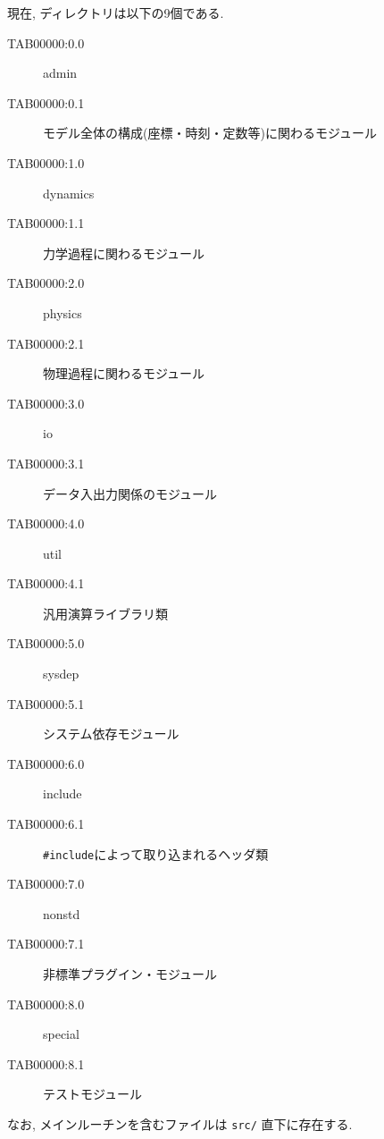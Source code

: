 現在, ディレクトリは以下の9個である. 
\begin{center}
\begin{description}
\item[TAB00000:0.0] admin
\item[TAB00000:0.1] モデル全体の構成(座標・時刻・定数等)に関わるモジュール
\item[TAB00000:1.0] dynamics
\item[TAB00000:1.1] 力学過程に関わるモジュール
\item[TAB00000:2.0] physics
\item[TAB00000:2.1] 物理過程に関わるモジュール
\item[TAB00000:3.0] io
\item[TAB00000:3.1] データ入出力関係のモジュール
\item[TAB00000:4.0] util
\item[TAB00000:4.1] 汎用演算ライブラリ類
\item[TAB00000:5.0] sysdep
\item[TAB00000:5.1] システム依存モジュール
\item[TAB00000:6.0] include
\item[TAB00000:6.1] {\tt \#include}によって取り込まれるヘッダ類
\item[TAB00000:7.0] nonstd
\item[TAB00000:7.1] 非標準プラグイン・モジュール
\item[TAB00000:8.0] special
\item[TAB00000:8.1] テストモジュール
\end{description}
\end{center}
なお, メインルーチンを含むファイルは {\tt src/} 直下に存在する.

